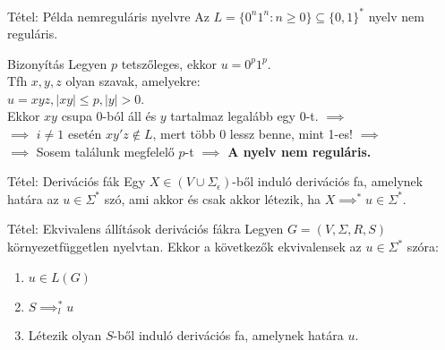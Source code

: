 \documentclass{beamer}
\begin{document}
\begin{frame}
\begin{block}{Tétel: Példa nemreguláris nyelvre}
Az $L = \{0^n1^n : n \geq 0\} \subseteq \{0, 1\}^*$ nyelv nem reguláris.
\end{block}

\begin{block}{Bizonyítás}
Legyen $p$  tetszőleges, ekkor $u = 0^p1^p$.\\
Tfh $x, y, z$ olyan szavak, amelyekre:\\
$u = xyz, |xy| \leq p, |y| > 0$.\\
Ekkor $xy$ csupa 0-ból áll és $y$ tartalmaz legalább egy 0-t. $\implies$\\
$\implies$ $i \neq 1$ esetén $xy'z \notin L$, mert több 0 lessz benne, mint 1-es! $\implies$\\
$\implies$ Sosem találunk megfelelő $p$-t $\implies$ \textbf{A nyelv nem reguláris.}
\end{block}

\end{frame}


\begin{frame}
\begin{block}{Tétel: Derivációs fák}
Egy $X \in (V \cup {\Sigma}_{\epsilon})$-ből induló derivációs fa, amelynek határa az $u \in {\Sigma}^*$ szó, ami akkor és csak akkor létezik, ha $X {\implies}^* u \in {\Sigma}^*$.
\end{block}

\begin{block}{Tétel: Ekvivalens állítások derivációs fákra}
Legyen $G = (V, {\Sigma}, R, S)$ környezetfüggetlen nyelvtan. Ekkor a következők ekvivalensek az $u \in {\Sigma}^*$ szóra:\\
\begin{enumerate}
\item $u \in L(G)$
\item $S {\implies}^*_l u$
\item Létezik olyan $S$-ből induló derivációs fa, amelynek határa $u$.
\end{enumerate}

\end{block}

\end{frame}
\end{document}
